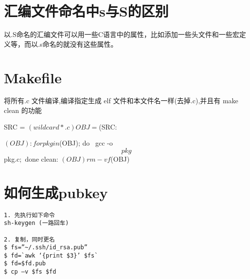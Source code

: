\section{汇编文件命名中s与S的区别}
以.S命名的汇编文件可以用一些C语言中的属性，比如添加一些头文件和一些宏定义等，而以.s命名的就没有这些属性。

\section{Makefile}
\begin{code}
将所有.c 文件编译,编译指定生成 elf 文件和本文件名一样(去掉.c),并且有 make clean 的功能

SRC = $(wildcard *.c)

OBJ =  $(SRC:%

$(OBJ):
    for pkg in $(OBJ);
    do \
        gcc -o $$pkg $$pkg.c;\
    done
clean: $(OBJ)

    rm -vf  $(OBJ) 
\end{code}

\section{如何生成pubkey}
\begin{verbatim}
1. 先执行如下命令
sh-keygen (一路回车)

2. 复制，同时更名
$ fs=”~/.ssh/id_rsa.pub”
$ fd=`awk ‘{print $3}’ $fs`
$ fd=$fd.pub
$ cp –v $fs $fd
\end{verbatim}

